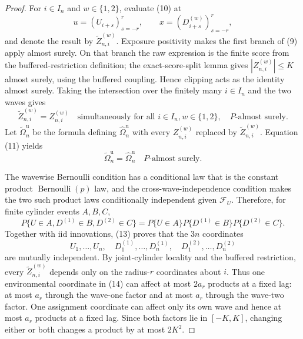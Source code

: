 \documentclass{article}
\begin{document}
\begin{proof}
For \(i\in I_n\) and \(w\in\{1,2\}\), evaluate (10) at
\[
 u=(U_{i+s})_{s=-r}^r,
 \qquad x=(D_{i+s}^{(w)})_{s=-r}^r,
\]
and denote the result by \(\widetilde Z_{n,i}^{(w)}\).  Exposure positivity makes the first branch of (9) apply almost surely.  On that branch the raw expression is the finite score from the buffered-restriction definition; the exact-score-split lemma gives \(|Z_{n,i}^{(w)}|\le K\) almost surely, using the buffered coupling.  Hence clipping acts as the identity almost surely.  Taking the intersection over the finitely many \(i\in I_n\) and the two waves gives
\[
 \widetilde Z_{n,i}^{(w)}=Z_{n,i}^{(w)}
 \quad\text{simultaneously for all }i\in I_n, w\in\{1,2\},
 \quad P\text{-almost surely}. \tag{11}
\]
Let \(\widetilde\Omega_n^{\mathrm u}\) be the formula defining \(\widehat\Omega_n^{\mathrm u}\) with every \(Z_{n,i}^{(w)}\) replaced by \(\widetilde Z_{n,i}^{(w)}\).  Equation (11) yields
\[
 \widetilde\Omega_n^{\mathrm u}=\widehat\Omega_n^{\mathrm u}
 \quad P\text{-almost surely}. \tag{12}
\]

The wavewise Bernoulli condition has a conditional law that is the constant product \(\operatorname{Bernoulli}(p)\) law, and the cross-wave-independence condition makes the two such product laws conditionally independent given \(\mathcal F_U\).  Therefore, for finite cylinder events \(A,B,C\),
\[
 P\{U\in A,D^{(1)}\in B,D^{(2)}\in C\}
 =P\{U\in A\}P\{D^{(1)}\in B\}P\{D^{(2)}\in C\}. \tag{13}
\]
Together with iid innovations, (13) proves that the \(3n\) coordinates
\[
 U_1,\ldots,U_n,
 \quad D_1^{(1)},\ldots,D_n^{(1)},
 \quad D_1^{(2)},\ldots,D_n^{(2)} \tag{14}
\]
are mutually independent.  By joint-cylinder locality and the buffered restriction, every \(\widetilde Z_{n,i}^{(w)}\) depends only on the radius-\(r\) coordinates about \(i\).  Thus one environmental coordinate in (14) can affect at most \(2a_r\) products at a fixed lag: at most \(a_r\) through the wave-one factor and at most \(a_r\) through the wave-two factor.  One assignment coordinate can affect only its own wave and hence at most \(a_r\) products at a fixed lag.  Since both factors lie in \([-K,K]\), changing either or both changes a product by at most \(2K^2\).


\end{proof}
\end{document}
